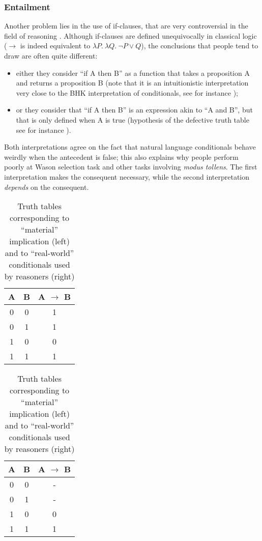 \documentclass[french]{article}
\begin{document}
\subsubsection{Entailment}
Another problem lies in the use of if-clauses, that are very controversial in the field of reasoning \cite{johnsonlaird1999,barrouillet2000}. Although if-clauses are defined unequivocally in classical logic ($\rightarrow$ is indeed equivalent to $\lambda P. \ \lambda Q. \ \neg P \vee Q$), the conclusions that people tend to draw are often quite different:
\begin{itemize}
	\item either they consider ``if A then B'' as a function that takes a proposition A and returns a proposition B (note that it is an intuitionistic interpretation very close to the BHK interpretation of conditionals, see for instance \cite{troelstra1977});
	\item or they consider that ``if A then B'' is an expression akin to ``A and B'', but that is only defined when A is true (hypothesis of the defective truth table see for instance \cite{byrne2009}).
\end{itemize}
Both interpretations agree on the fact that natural language conditionals behave weirdly when the antecedent is false; this also explains why people perform poorly at Wason selection task and other tasks involving \textit{modus tollens}. The first interpretation makes the consequent necessary, while the second interpretation \textit{depends} on the consequent.
\begin{table}[H]
	\centering
	\begin{tabular}{c|c|c}
		A & B & A $\rightarrow$ B \\ \hline
		0&0&1\\
		0&1&1\\
		1&0&0\\
		1&1&1\\
	\end{tabular}\qquad
	\begin{tabular}{c|c|c}
		A & B & A $\rightarrow$ B \\ \hline
		0&0& -\\
		0&1& -\\
		1&0&0\\
		1&1&1\\
	\end{tabular}
	\caption{Truth tables corresponding to ``material'' implication (left) and to ``real-world'' conditionals used by reasoners  (right)}
\end{table}
\end{document}
